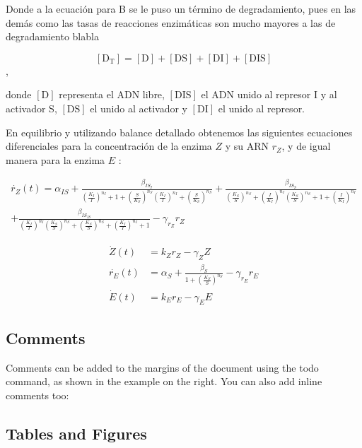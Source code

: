 \documentclass[12pt]{article}
\begin{document}
Donde a la ecuaci\'on para B se le puso un t\'ermino de degradamiento, pues en las dem\'as como las tasas de reacciones enzim\'aticas son mucho mayores a las de degradamiento blabla

$$[\text{D}_{\text{T}}]=[\text{D}]+[\text{DS}]+[\text{DI}]+[\text{DIS}]$$,

donde $[\text{D}]$ representa el ADN libre, $[\text{DIS}]$ el ADN unido al represor I y al activador S, $[\text{DS}]$ el unido al activador y $[\text{DI}]$ el unido al represor.

En equilibrio y utilizando balance detallado obtenemos las siguientes ecuaciones diferenciales para la concentraci\'on de la enzima $Z$ y su ARN $r_Z$, y de igual manera para la enzima $E$ :

\begin{multline}
\dot{r_Z}(t) = 
\alpha_{IS}
+ \frac{\beta_{IS_I}}{\left( \frac{K_I}{I} \right)^{n_I} + 1 + \left( \frac{S}{K_S} \right)^{n_S} \left( \frac{K_I}{I} \right)^{n_I} + \left( \frac{S}{K_S} \right)^{n_S}}
+ \frac{\beta_{IS_S}}{\left( \frac{K_S}{S} \right)^{n_S} + \left( \frac{I}{K_I} \right)^{n_I} \left( \frac{K_S}{S} \right)^{n_S} + 1 + \left( \frac{I}{K_I} \right)^{n_I}}\\
+ \frac{\beta_{IS_{IS}}}{\left( \frac{K_I}{I} \right)^{n_I} \left( \frac{K_S}{S} \right)^{n_S} + \left( \frac{K_S}{S} \right)^{n_S} + \left( \frac{K_I}{I} \right)^{n_I} + 1}
- \gamma_{r_Z} r_Z
\end{multline}

\begin{align}
\dot{Z}(t) &= k_Z r_Z - \gamma_Z Z\\
\dot{r_E}(t) &= \alpha_S + \frac{\beta_S}{1+ \left( \frac{K_S}{S}\right)^{n_S}} - \gamma_{r_E} r_E\\
\dot{E}(t) &= k_E r_E - \gamma_EE
\end{align}

\subsection{Comments}

Comments can be added to the margins of the document using the  todo command, as shown in the example on the right. You can also add inline comments too:


\subsection{Tables and Figures}
\end{document}
